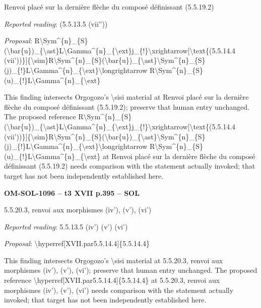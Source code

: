 Renvoi placé sur la dernière flèche du composé définissant (5.5.19.2)\par
\emph{Reported reading}: (5.5.13.5 (vii''))\par
\emph{Proposal}: R\textbackslash{}Sym\textasciicircum{}\{n\}\_\{S\}(\textbackslash{}bar\{u\})\_\{\textbackslash{}ast\}L\textbackslash{}Gamma\textasciicircum{}\{n\}\_\{\textbackslash{}ext\}j\_\{!\}\textbackslash{}xrightarrow[\textbackslash{}text\{(5.5.14.4 (vii'))\}]\{\textbackslash{}sim\}R\textbackslash{}Sym\textasciicircum{}\{n\}\_\{S\}(\textbackslash{}bar\{u\})\_\{\textbackslash{}ast\}\textbackslash{}Sym\textasciicircum{}\{n\}\_\{S\}(j)\_\{!\}L\textbackslash{}Gamma\textasciicircum{}\{n\}\_\{\textbackslash{}ext\}\textbackslash{}longrightarrow R\textbackslash{}Sym\textasciicircum{}\{n\}\_\{S\}(u)\_\{!\}L\textbackslash{}Gamma\textasciicircum{}\{n\}\_\{\textbackslash{}ext\}\par
This finding intersects Orgogozo's \textbackslash{}sisi material at Renvoi placé sur la dernière flèche du composé définissant (5.5.19.2); preserve that human entry unchanged. The proposed reference R\textbackslash{}Sym\textasciicircum{}\{n\}\_\{S\}(\textbackslash{}bar\{u\})\_\{\textbackslash{}ast\}L\textbackslash{}Gamma\textasciicircum{}\{n\}\_\{\textbackslash{}ext\}j\_\{!\}\textbackslash{}xrightarrow[\textbackslash{}text\{(5.5.14.4 (vii'))\}]\{\textbackslash{}sim\}R\textbackslash{}Sym\textasciicircum{}\{n\}\_\{S\}(\textbackslash{}bar\{u\})\_\{\textbackslash{}ast\}\textbackslash{}Sym\textasciicircum{}\{n\}\_\{S\}(j)\_\{!\}L\textbackslash{}Gamma\textasciicircum{}\{n\}\_\{\textbackslash{}ext\}\textbackslash{}longrightarrow R\textbackslash{}Sym\textasciicircum{}\{n\}\_\{S\}(u)\_\{!\}L\textbackslash{}Gamma\textasciicircum{}\{n\}\_\{\textbackslash{}ext\} at Renvoi placé sur la dernière flèche du composé définissant (5.5.19.2) needs comparison with the statement actually invoked; that target has not been independently established here.\par
\par\noindent\textbf{OM-SOL-1096 -- t3 XVII p.395 -- SOL}\par
5.5.20.3, renvoi aux morphismes (iv'), (v'), (vi')\par
\emph{Reported reading}: 5.5.13.5 (iv') (v') (vi')\par
\emph{Proposal}: \textbackslash{}hyperref[XVII.par5.5.14.4]\{5.5.14.4\}\par
This finding intersects Orgogozo's \textbackslash{}sisi material at 5.5.20.3, renvoi aux morphismes (iv'), (v'), (vi'); preserve that human entry unchanged. The proposed reference \textbackslash{}hyperref[XVII.par5.5.14.4]\{5.5.14.4\} at 5.5.20.3, renvoi aux morphismes (iv'), (v'), (vi') needs comparison with the statement actually invoked; that target has not been independently established here.\par
